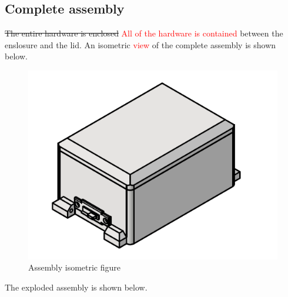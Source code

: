 \documentclass[12pt, titlepage]{article}
\begin{document}
\subsection{Complete assembly}
\sout{The entire hardware is enclosed} \textcolor{red}{All of the hardware is contained} between the enslosure and the lid. An isometric \textcolor{red}{view} of the complete assembly is shown below. \\
\begin{figure}[H]
  \vspace*{-0.75cm}
  \centering
  \includegraphics[width=\textwidth,height=\textheight/2,keepaspectratio]{Assembly_ISO.png}
  \caption{Assembly isometric figure}
  \label{Assembly ISO} 
\end{figure}
\noindent The exploded assembly is shown below. \\
\end{document}
